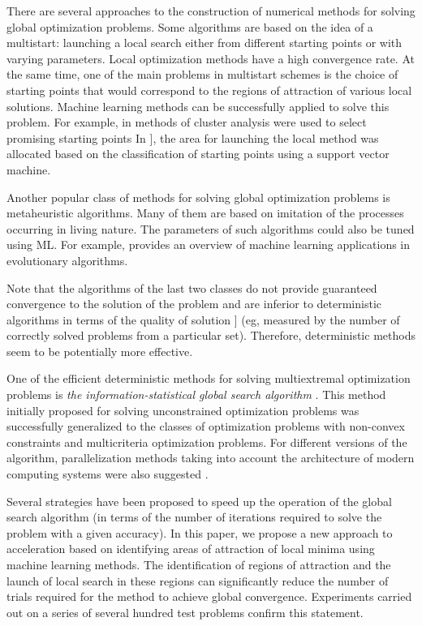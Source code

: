 \documentclass[entropy,article,submit,moreauthors,pdftex]{Definitions/mdpi}
\begin{document}
There are several approaches to the construction of numerical methods for solving global optimization problems. 
Some algorithms are based on the idea of a multistart: launching a local search either from different starting points or with varying parameters. Local optimization methods have a high convergence rate. At the same time, one of the main problems in multistart schemes is the choice of starting points that would correspond to the regions of attraction of various local solutions. 
Machine learning methods can be successfully applied to solve this problem.  
For example, in \cite{RinnooyKan1987} methods of cluster analysis were used to select promising starting points
In \cite{Cassioli2012} ], the area for launching the local method was allocated based on the classification of starting points using a support vector machine.

Another popular class of methods for solving global optimization problems is metaheuristic algorithms. 
Many of them are based on imitation of the processes occurring in living nature. The parameters of such algorithms could also be tuned using ML. For example, \cite{Jin2005} provides an overview of machine learning applications in evolutionary algorithms.

Note that the algorithms of the last two classes do not provide guaranteed convergence to the solution of the problem and are inferior to deterministic algorithms in terms of the quality of solution \cite{Kvasov2018,Sergeyev2018} ] (eg, measured by the number of correctly solved problems from a particular set). Therefore, deterministic methods seem to be potentially more effective.


One of the efficient deterministic methods for solving multiextremal optimization problems is \textit{the information-statistical global search algorithm} \cite{Strongin2000}. This method initially proposed for solving unconstrained optimization problems was successfully generalized to the classes of optimization problems with non-convex constraints and multicriteria optimization problems. For different versions of the algorithm, parallelization methods taking into account the architecture of modern computing systems were also suggested \cite{Barkalov2016,globalizerSystem,Strongin2018}.


Several strategies have been proposed to speed up the operation of the global search algorithm (in terms of the number of iterations required to solve the problem with a given accuracy). In this paper, we propose a new approach to acceleration based on identifying areas of attraction of local minima using machine learning methods. The identification of regions of attraction and the launch of local search in these regions can significantly reduce the number of trials required for the method to achieve global convergence. Experiments carried out on a series of several hundred test problems confirm this statement. 
\end{document}
